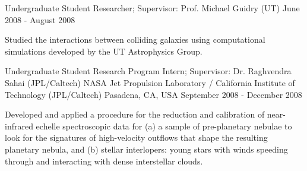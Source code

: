 \begin{cventries}
\cventry
    {Undergraduate Student Researcher; Supervisor: Prof. Michael Guidry (UT)}
    {}
    {}
    {June 2008 - August 2008}
    {
      \begin{cvitems}
        \item {Studied the interactions between colliding galaxies using computational simulations developed by the UT Astrophysics Group.}
      \end{cvitems}
    }\vspace{-6pt}

\cventry
    {Undergraduate Student Research Program Intern; Supervisor: Dr. Raghvendra Sahai (JPL/Caltech)}
    {NASA Jet Propulsion Laboratory / California Institute of Technology (JPL/Caltech)}
    {Pasadena, CA, USA}
    {September 2008 - December 2008}
    {
      \begin{cvitems}
        \item {Developed and applied a procedure for the reduction and calibration of near-infrared echelle spectroscopic data for (a)  a sample of pre-planetary nebulae to look for the signatures of high-velocity outflows that shape the resulting planetary nebula, and (b) stellar interlopers: young stars with winds speeding through and interacting with dense interstellar clouds.}
      \end{cvitems}
    }
\end{cventries}
